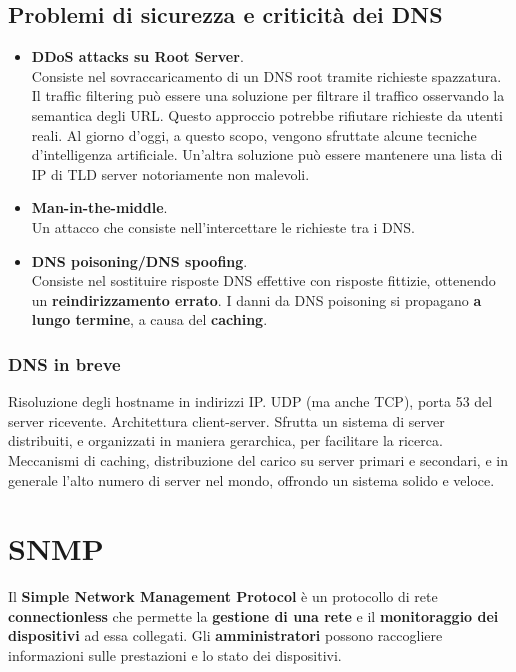 \subsection{Problemi di sicurezza e criticità dei DNS}
\begin{itemize}
    \item \textbf{DDoS attacks su Root Server}.\\
    Consiste nel sovraccaricamento di un DNS root tramite richieste spazzatura. Il traffic filtering può essere una soluzione per filtrare il traffico osservando la semantica degli URL. Questo approccio potrebbe rifiutare richieste da utenti reali. Al giorno d'oggi, a questo scopo, vengono sfruttate alcune tecniche d'intelligenza artificiale.
    Un'altra soluzione può essere mantenere una lista di IP di TLD server notoriamente non malevoli.
    
    \item \textbf{Man-in-the-middle}.\\
    Un attacco che consiste nell'intercettare le richieste tra i DNS.
    
    \item \textbf{DNS poisoning/DNS spoofing}.\\
    Consiste nel sostituire risposte DNS effettive con risposte fittizie, ottenendo un \textbf{reindirizzamento errato}. I danni da DNS poisoning si propagano \textbf{a lungo termine}, a causa del \textbf{caching}.
\end{itemize}

\subsubsection{DNS in breve}
Risoluzione degli hostname in indirizzi IP. UDP (ma anche TCP), porta 53 del server ricevente. Architettura client-server. Sfrutta un sistema di server distribuiti, e organizzati in maniera gerarchica, per facilitare la ricerca. Meccanismi di caching, distribuzione del carico su server primari e secondari, e in generale l'alto numero di server nel mondo, offrondo un sistema solido e veloce.

\newpage

\section{SNMP}
Il \textbf{Simple Network Management Protocol} è un protocollo di rete \textbf{connectionless} che permette la \textbf{gestione di una rete} e il \textbf{monitoraggio dei dispositivi} ad essa collegati. Gli \textbf{amministratori} possono raccogliere informazioni sulle prestazioni e lo stato dei dispositivi.

